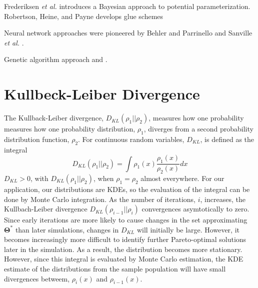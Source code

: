Frederiksen \emph{et al.} \cite{fredericksen2004_bayesian_fitting} introduces a Bayesian approach to potential parameterization.
Robertson, Heine, and Payne \cite{robertson1993_glue_schemes} develops glue schemes

Neural network approaches were pioneered by Behler and Parrinello \cite{behler2007_NN_potdev} and Sanville \emph{et al.} \cite{sanville2008_NN_potdev_si}.

Genetic algorithm approach\cite{marques2008_ga_potdev} and \cite{hunger1998_ga_potdev}.
\section{Kullbeck-Leiber Divergence}

The Kullback-Leiber divergence\cite{kullback1951_kld}, $D_{KL}(\rho_1\vert\vert\rho_2)$, measures how one probability measures how one probability distribution, $\rho_1$, diverges from a second probability distribution function, $\rho_2$.
For continuous random variables, $D_{KL}$, is defined as the integral
\begin{equation}
   D_{KL}(\rho_1\vert\vert\rho_2)=\int \rho_1(x) \frac{\rho_1(x)}{\rho_2(x)}dx
\end{equation}
$D_{KL} > 0$, with $D_{KL}(\rho_1\vert\vert\rho_2)$, when $\rho_1=\rho_2$ almost everywhere.
For our application, our distributions are KDEs, so the evaluation of the integral can be done by Monte Carlo integration.
As the number of iterations, $i$, increases, the Kullbach-Leiber divergence $D_{KL}(\rho_{i-1}\vert\vert\rho_i)$ convergences asymtotically to zero.
Since early iterations are more likely to cause changes in the set approximating $\bm{\Theta}^*$ than later simulations, changes in $D_{KL}$ will initially be large.
However, it becomes increasingly more difficult to identify further Pareto-optimal solutions later in the simulation.
As a result, the distribution becomes more stationary.
However, since this integral is evaluated by Monte Carlo estimation, the KDE estimate of the distributions from the sample population will have small divergences betweem, $\rho_i(x)$ and $\rho_{i-1}(x)$.
